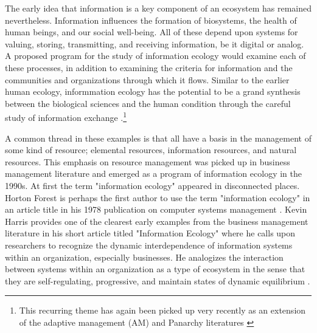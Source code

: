 The early idea that information is a key component of an ecosystem has remained nevertheless. Information influences the formation of biosystems, the health of human beings, and our social well-being. All of these depend upon systems for valuing, storing, transmitting, and receiving information, be it digital or analog. A proposed program for the study of information ecology would examine each of these processes, in addition to examining the criteria for information and the communities and organizations through which it flows. Similar to the earlier human ecology, informmation ecology has the potential to be a grand synthesis between the biological sciences and the human condition through the careful study of information exchange \citep{eryomin_information_1998}.\footnote{This recurring theme has again been picked up very recently as an extension of the adaptive management (AM) and Panarchy literatures \citep{eddy_information_2014}} 

A common thread in these examples is that all have a basis in the management of some kind of resource; elemental resources, information resources, and natural resources. This emphasis on resource management was picked up in business management literature and emerged as  a program of information ecology in the 1990s. At first the term "information ecology" appeared in disconnected places. Horton Forest is perhaps the first author to use the term "information ecology" in an article title in his 1978 publication on computer systems management \citep{forest_1978}. Kevin Harris provides one of the clearest early examples from the business management literature in his short article titled "Information Ecology" where he calls upon researchers to recognize the dynamic interdependence of information systems within an organization, especially businesses. He analogizes the interaction between systems within an organization as a type of ecosystem in the sense that they are self-regulating, progressive, and maintain states of dynamic equilibrium \citep{harris_information_1989}. 